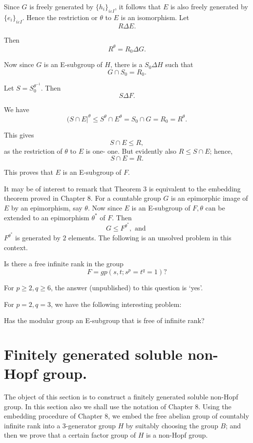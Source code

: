  Since $G$ is freely generated by $\bigg\{ h_i \bigg\}_{i \varepsilon
   I}$, it follows that $E$ is also freely generated by $\bigg\{ e_i
 \bigg\}_{i \varepsilon I}$. Hence the restriction or $\theta$ to $E$
 is an isomorphism. Let  
 $$
 R \Delta E.
 $$
 
 Then 
 $$
 R^{\theta} = R_0 \Delta G.
 $$
 
 Now since $G$ is an E-subgroup of $H$, there is a $S_0 \Delta H$ such that 
 $$
 G \cap S_0 = R_0.
 $$
 
 Let $S = S_0^{\theta^{-1}}$. Then 
 $$
 S \Delta F.
 $$
 
 We have 
 $$
 (S \cap E|^{\theta} \leq S^{\theta} \cap E^{\theta} = S_0 \cap G =
 R_0 = R^{\theta}. 
 $$
 
 This gives 
 $$
 S \cap E \leq R,
 $$
 as the restriction of $\theta$ to $E$ is one- one. But evidently also
 $R \leq S \cap E$; hence, 
 $$
 S \cap E =R.
 $$
 
This proves that $E$ is an E-subgroup of $F$.

It may be of interest to remark that Theorem $3$ is equivalent to the
embedding theorem proved in Chapter $8$. For a countable group $G$ is
an epimorphic image of $E$ by an epimorphism, say $\theta$. Now since
$E$ is an E-subgroup of $F, \theta$ can be extended to an epimorphism
$\theta^*$ of $F$. Then  
$$
G \leq F^{\theta^*}, \text{ and }
$$
$F^{\theta^*}$ is generated by $2$ elements. The following is an
unsolved problem in this context. 

\begin{unsolved problem}
  Is there a free infinite rank in the group 
  $$
  F =gp(s,t; s^p = t^q = 1) ?
  $$
\end{unsolved problem}

For $p \geq 2, q \geq 6$, the answer (unpublished) to this question is `yes'.

For $p = 2, q =3$, we have the following interesting problem:
\begin{problem}
  Has the modular group an E-subgroup that is free of infinite rank?
\end{problem}

\section{Finitely generated soluble non-Hopf group.}%

The object of this section is to construct a finitely generated
soluble non-Hopf group. In this section also we shall use the notation
of Chapter $8$. Using the embedding procedure of Chapter $8$, we embed
the free abelian group of countably infinite rank into a 3-generator
group $H$ by suitably choosing the group $B$; and then we prove that a
certain factor group of $H$ is a non-Hopf group. 

